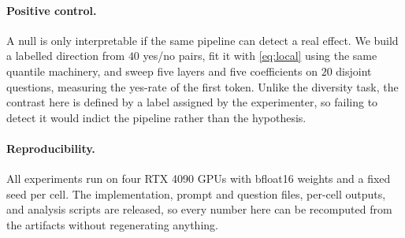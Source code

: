 \paragraph{Positive control.}
A null is only interpretable if the same pipeline can detect a real effect. We build a labelled
direction from $40$ yes/no pairs, fit it with \eqref{eq:local} using the same quantile machinery, and
sweep five layers and five coefficients on $20$ disjoint questions, measuring the yes-rate of the
first token. Unlike the diversity task, the contrast here is defined by a label assigned by the
experimenter, so failing to detect it would indict the pipeline rather than the hypothesis.

\paragraph{Reproducibility.}
All experiments run on four RTX 4090 GPUs with bfloat16 weights and a fixed seed per cell. The
implementation, prompt and question files, per-cell outputs, and analysis scripts are released, so
every number here can be recomputed from the artifacts without regenerating anything.
